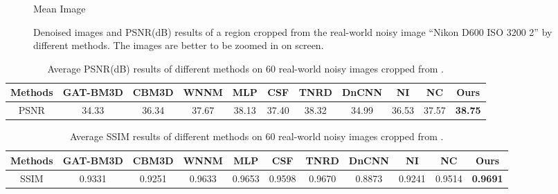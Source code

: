 \begin{figure}[t!]
{\begin{minipage}[t]{0.19\textwidth}
{\footnotesize Mean Image}
\end{minipage}
}\vspace{-3mm}
    \caption{Denoised images and PSNR(dB) results of a region cropped from the real-world noisy image ``Nikon D600 ISO 3200 2'' \cite{crosschannel2016} by different methods. The images are better to be zoomed in on screen.}
    \label{fig3-14}
\end{figure}


\begin{table}
\begin{adjustwidth}{-.2cm}{}
\scriptsize
\caption{Average PSNR(dB) results of different methods on 60 real-world noisy images cropped from \cite{crosschannel2016}.}
\label{tab3-4}
\begin{center}
\renewcommand\arraystretch{1}
\begin{tabular}{|c||c|c|c|c|c|c|c|c|c|c|}
\hline
Methods
&\textbf{GAT-BM3D}
&\textbf{CBM3D}
&\textbf{WNNM}
&\textbf{MLP}
&\textbf{CSF} 
&\textbf{TNRD} 
&\textbf{DnCNN}
&\textbf{NI} 
&\textbf{NC} 
&\textbf{Ours} 
\\
\hline
PSNR  
& 34.33 & 36.34 & 37.67 & 38.13 & 37.40 & 38.32 & 34.99 & 36.53 & 37.57 & \textbf{38.75}
\\
\hline
\end{tabular}
\end{center}
\end{adjustwidth}
\end{table}

\begin{table}[t!]
\begin{adjustwidth}{-.2cm}{}
\scriptsize
\caption{Average SSIM \cite{ssim} results of different methods on 60 real-world noisy images cropped from \cite{crosschannel2016}.}
\label{tab3-5}
\begin{center}
\renewcommand\arraystretch{1}
\begin{tabular}{|c||c|c|c|c|c|c|c|c|c|c|}
\hline
Methods
&\textbf{GAT-BM3D}
&\textbf{CBM3D}
&\textbf{WNNM}
&\textbf{MLP}
&\textbf{CSF} 
&\textbf{TNRD} 
&\textbf{DnCNN}
&\textbf{NI} 
&\textbf{NC} 
&\textbf{Ours} 
\\
\hline
SSIM  
& 0.9331 & 0.9251 & 0.9633 & 0.9653 & 0.9598 & 0.9670 & 0.8873 & 0.9241 & 0.9514 & \textbf{0.9691}
\\
\hline
\end{tabular}
\end{center}
\end{adjustwidth}\vspace{-4mm}
\end{table}





